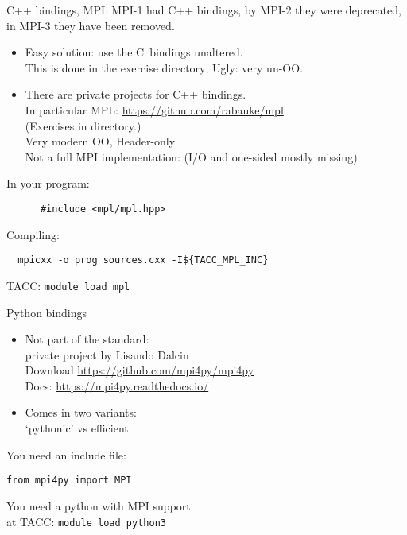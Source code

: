 \begin{mpl}
  \addtocounter{slidecount}{-1}
\begin{numberedframe}{C++ bindings, MPL}
  MPI-1 had C++ bindings, by MPI-2 they were deprecated, in MPI-3 they have been removed.
  \begin{itemize}
  \item Easy solution: use the C~bindings unaltered.\\
    This is done in the  exercise directory;  Ugly: very un-OO.
  \item There are private projects for C++ bindings.\\
    In particular
    MPL: \url{https://github.com/rabauke/mpl}\\
    (Exercises in  directory.)\\
    Very modern OO,  Header-only\\
    Not a full MPI implementation: (I/O and one-sided mostly missing)
  \end{itemize}
    In your program:
    \begin{lstlisting}
      #include <mpl/mpl.hpp>
  \end{lstlisting}
    Compiling:
\begin{verbatim}
  mpicxx -o prog sources.cxx -I${TACC_MPL_INC}
\end{verbatim}
TACC: \texttt{module load mpl}
\end{numberedframe}
\end{mpl}

\begin{python}
  \addtocounter{slidecount}{-1}
\begin{numberedframe}{Python bindings}
    \label{sl:mpi-header-p}
    \begin{itemize}
    \item Not part of the standard:\\
      private project by Lisando Dalcin\\
      Download \url{https://github.com/mpi4py/mpi4py}\\
      Docs: \url{https://mpi4py.readthedocs.io/}
    \item Comes in two variants:\\
      `pythonic' vs efficient
    \end{itemize}
    You need an include file:
\begin{verbatim}
from mpi4py import MPI
\end{verbatim}
You need a python with MPI support\\
at TACC: \texttt{module load python3}
\end{numberedframe}
\end{python}

